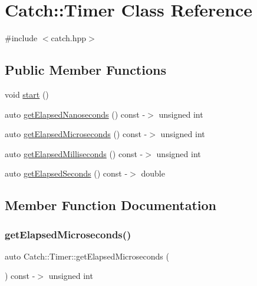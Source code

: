 \hypertarget{classCatch_1_1Timer}{}\section{Catch\+:\+:Timer Class Reference}
\label{classCatch_1_1Timer}


{\ttfamily \#include $<$catch.\+hpp$>$}

\subsection*{Public Member Functions}
\begin{DoxyCompactItemize}
\item 
void \mbox{\hyperlink{classCatch_1_1Timer_a0a56e879e43f36c102bf9ea8b5fc8b72}{start}} ()
\item 
auto \mbox{\hyperlink{classCatch_1_1Timer_a5aed94a75f5767763f68e2afc38bc709}{get\+Elapsed\+Nanoseconds}} () const -\/$>$ unsigned int
\item 
auto \mbox{\hyperlink{classCatch_1_1Timer_a34f3d49627e01bcd40cf77fa28ac4f1a}{get\+Elapsed\+Microseconds}} () const -\/$>$ unsigned int
\item 
auto \mbox{\hyperlink{classCatch_1_1Timer_a30aaf458dbb59dd8ac8971c9c62e0eac}{get\+Elapsed\+Milliseconds}} () const -\/$>$ unsigned int
\item 
auto \mbox{\hyperlink{classCatch_1_1Timer_a065e37e3c9eb16bd4dcf41971d8deedc}{get\+Elapsed\+Seconds}} () const -\/$>$ double
\end{DoxyCompactItemize}


\subsection{Member Function Documentation}
\mbox{\label{classCatch_1_1Timer_a34f3d49627e01bcd40cf77fa28ac4f1a}} 
\subsubsection{\texorpdfstring{get\+Elapsed\+Microseconds()}{getElapsedMicroseconds()}}
{\footnotesize\ttfamily auto Catch\+::\+Timer\+::get\+Elapsed\+Microseconds (\begin{DoxyParamCaption}{ }\end{DoxyParamCaption}) const -\/$>$  unsigned int}

